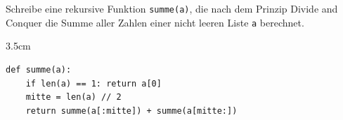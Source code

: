 \question[4]
Schreibe eine rekursive Funktion \texttt{summe(a)}, die nach dem Prinzip Divide and Conquer die Summe aller Zahlen einer nicht leeren Liste \texttt{a} berechnet.
\begin{solutionbox}{3.5cm}
\begin{lstlisting}
def summe(a):
    if len(a) == 1: return a[0]
    mitte = len(a) // 2
    return summe(a[:mitte]) + summe(a[mitte:])
\end{lstlisting}
\end{solutionbox}
